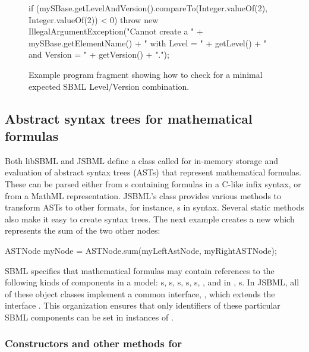 \begin{figure}[bh]%
  \begin{example}
if (mySBase.getLevelAndVersion().compareTo(Integer.valueOf(2), Integer.valueOf(2)) < 0) {
  throw new IllegalArgumentException("Cannot create a " + mySBase.getElementName() + 
  		" with Level = " + getLevel() + " and Version = " + getVersion() + ".");
}\end{example}
  \vspace*{-1ex}
  \caption{Example program fragment showing how to check for a minimal
    expected SBML Level/Version combination.}
  \label{fig:LevelVersionCheck}
\end{figure}


\subsection{Abstract syntax trees for mathematical formulas}

Both libSBML and JSBML define a class called \ASTNode for in-memory storage
and evaluation of abstract syntax trees (ASTs) that represent mathematical
formulas. These can be parsed either from \String{}s containing formulas in a
C-like infix syntax, or from a MathML  representation.  JSBML's
\ASTNode class provides various methods to transform ASTs to other formats,
for instance, s in \latex syntax.  Several static methods also
make it easy to create syntax trees.  The next example creates a new
\ASTNode which represents the sum of the two other nodes:

\begin{example}
ASTNode myNode = ASTNode.sum(myLeftAstNode, myRightASTNode);
\end{example}

SBML specifies that mathematical formulas may contain references to the
following kinds of components in a model: \Parameter{}s,
\LocalParameter{}s, \FunctionDefinition{}s, \Reaction{}s, \Compartment{}s,
\Species, and in \SBMLthree, \SpeciesReference{}s.  In JSBML, all of these
object classes implement a common interface, \CallableSBase, which extends
the interface \NamedSBaseWithDerivedUnit. This organization ensures that
only identifiers of these particular SBML components can be set in
instances of \ASTNode.


\subsubsection{Constructors and other methods for \CallableSBase}

